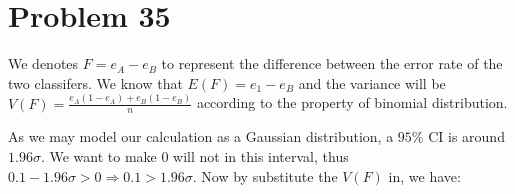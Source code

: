 \documentclass[12pt]{article}
\begin{document}
\section{Problem 35}


We denotes $F = e_A - e_B$ to represent the difference between the error rate of the two classifers. We know that $E(F) = e_1 - e_B$ and the variance will be $V(F) = \frac{e_A(1-e_A) + e_B(1-e_B)}{n}$ according to the property of binomial distribution.

As we may model our calculation as a Gaussian distribution, a $95\%$ CI is around $1.96 \sigma$. We want to make 0 will not in this interval, thus $0.1 -1.96 \sigma> 0 \Longrightarrow 0.1 > 1.96 \sigma$. Now by substitute the $V(F)$ in, we have:
\end{document}
